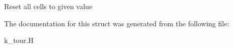 Reset all cells to given value 

The documentation for this struct was generated from the following file\-:\begin{DoxyCompactItemize}
\item 
k\-\_\-tour.\-H\end{DoxyCompactItemize}
